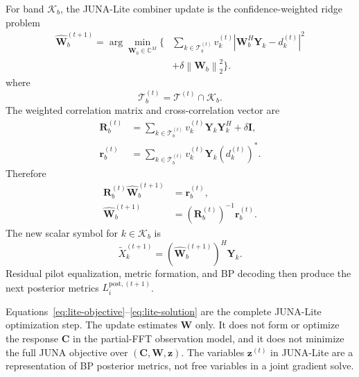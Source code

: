 \documentclass[conference]{IEEEtran}
\newcommand{\C}{\mathbb{C}}
\newcommand{\norm}[1]{\left\lVert #1\right\rVert}
\newcommand{\Kset}{\mathcal{K}}
\begin{document}
For band \(\Kset_b\), the JUNA-Lite combiner update is the
confidence-weighted ridge problem
\begin{equation}
  \begin{aligned}
    \widehat{\mathbf W}_b^{(t+1)}
    =
    \arg\min_{\mathbf W_b\in\C^M}
    \Bigg\{&
    \sum_{k\in\mathcal T_b^{(t)}}
    v_k^{(t)}
    \left|
    \mathbf W_b^H\mathbf Y_k-d_k^{(t)}
    \right|^2\\
    &+
    \delta\norm{\mathbf W_b}_2^2
    \Bigg\}.
  \end{aligned}
  \label{eq:lite-objective}
\end{equation}
where
\begin{equation}
  \mathcal T_b^{(t)}
  =
  \mathcal T^{(t)}\cap\Kset_b .
  \label{eq:band-targets}
\end{equation}
The weighted correlation matrix and cross-correlation vector are
\begin{align}
  \mathbf R_b^{(t)}
  &=
  \sum_{k\in\mathcal T_b^{(t)}}
  v_k^{(t)}
  \mathbf Y_k\mathbf Y_k^H
  +
  \delta\mathbf I,
  \label{eq:lite-correlation}\\
  \mathbf r_b^{(t)}
  &=
  \sum_{k\in\mathcal T_b^{(t)}}
  v_k^{(t)}
  \mathbf Y_k
  \left(d_k^{(t)}\right)^* .
  \label{eq:lite-cross}
\end{align}
Therefore
\begin{align}
  \mathbf R_b^{(t)}
  \widehat{\mathbf W}_b^{(t+1)}
  &=
  \mathbf r_b^{(t)},
  \label{eq:lite-normal}\\
  \widehat{\mathbf W}_b^{(t+1)}
  &=
  \left(\mathbf R_b^{(t)}\right)^{-1}
  \mathbf r_b^{(t)}.
  \label{eq:lite-solution}
\end{align}
The new scalar symbol for \(k\in\Kset_b\) is
\begin{equation}
  \widetilde X_k^{(t+1)}
  =
  \left(\widehat{\mathbf W}_b^{(t+1)}\right)^H
  \mathbf Y_k.
  \label{eq:lite-output}
\end{equation}
Residual pilot equalization, metric formation, and BP decoding then produce
the next posterior metrics \(L_i^{\mathrm{post},(t+1)}\).

Equations~\eqref{eq:lite-objective}--\eqref{eq:lite-solution} are the complete
JUNA-Lite optimization step.  The update estimates \(\mathbf W\) only.  It does
not form or optimize the response \(\mathbf C\) in the partial-FFT observation
model, and it does not
minimize the full JUNA objective over
\((\mathbf C,\mathbf W,\mathbf z)\).  The variables \(\mathbf z^{(t)}\) in
JUNA-Lite are a representation of BP posterior metrics, not free variables in
a joint gradient solve.
\end{document}

